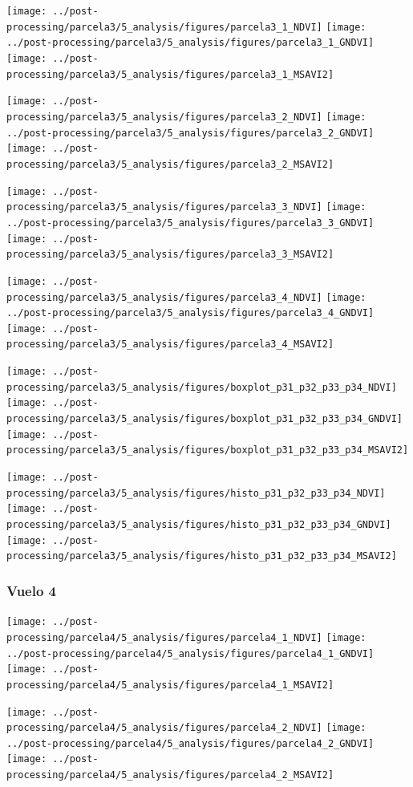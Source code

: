 \documentclass[spanish,openany]{article}
\begin{document}
\texttt{[image: ../post-processing/parcela3/5\_analysis/figures/parcela3\_1\_NDVI]}
\texttt{[image: ../post-processing/parcela3/5\_analysis/figures/parcela3\_1\_GNDVI]}
\texttt{[image: ../post-processing/parcela3/5\_analysis/figures/parcela3\_1\_MSAVI2]}

\texttt{[image: ../post-processing/parcela3/5\_analysis/figures/parcela3\_2\_NDVI]}
\texttt{[image: ../post-processing/parcela3/5\_analysis/figures/parcela3\_2\_GNDVI]}
\texttt{[image: ../post-processing/parcela3/5\_analysis/figures/parcela3\_2\_MSAVI2]}

\texttt{[image: ../post-processing/parcela3/5\_analysis/figures/parcela3\_3\_NDVI]}
\texttt{[image: ../post-processing/parcela3/5\_analysis/figures/parcela3\_3\_GNDVI]}
\texttt{[image: ../post-processing/parcela3/5\_analysis/figures/parcela3\_3\_MSAVI2]}

\texttt{[image: ../post-processing/parcela3/5\_analysis/figures/parcela3\_4\_NDVI]}
\texttt{[image: ../post-processing/parcela3/5\_analysis/figures/parcela3\_4\_GNDVI]}
\texttt{[image: ../post-processing/parcela3/5\_analysis/figures/parcela3\_4\_MSAVI2]}

\texttt{[image: ../post-processing/parcela3/5\_analysis/figures/boxplot\_p31\_p32\_p33\_p34\_NDVI]}
\texttt{[image: ../post-processing/parcela3/5\_analysis/figures/boxplot\_p31\_p32\_p33\_p34\_GNDVI]}
\texttt{[image: ../post-processing/parcela3/5\_analysis/figures/boxplot\_p31\_p32\_p33\_p34\_MSAVI2]}

\texttt{[image: ../post-processing/parcela3/5\_analysis/figures/histo\_p31\_p32\_p33\_p34\_NDVI]}
\texttt{[image: ../post-processing/parcela3/5\_analysis/figures/histo\_p31\_p32\_p33\_p34\_GNDVI]}
\texttt{[image: ../post-processing/parcela3/5\_analysis/figures/histo\_p31\_p32\_p33\_p34\_MSAVI2]}

\subsubsection{Vuelo 4}\label{vuelo-4-1}

\texttt{[image: ../post-processing/parcela4/5\_analysis/figures/parcela4\_1\_NDVI]}
\texttt{[image: ../post-processing/parcela4/5\_analysis/figures/parcela4\_1\_GNDVI]}
\texttt{[image: ../post-processing/parcela4/5\_analysis/figures/parcela4\_1\_MSAVI2]}

\texttt{[image: ../post-processing/parcela4/5\_analysis/figures/parcela4\_2\_NDVI]}
\texttt{[image: ../post-processing/parcela4/5\_analysis/figures/parcela4\_2\_GNDVI]}
\texttt{[image: ../post-processing/parcela4/5\_analysis/figures/parcela4\_2\_MSAVI2]}
\end{document}
